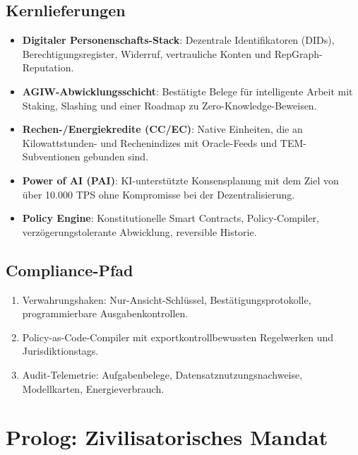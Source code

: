 \documentclass[11pt]{article}
\begin{document}
\subsection{Kernlieferungen}
\begin{itemize}[noitemsep]
  \item \textbf{Digitaler Personenschafts-Stack}: Dezentrale Identifikatoren (DIDs), Berechtigungsregister, Widerruf, vertrauliche Konten und RepGraph-Reputation.
  \item \textbf{AGIW-Abwicklungsschicht}: Bestätigte Belege für intelligente Arbeit mit Staking, Slashing und einer Roadmap zu Zero-Knowledge-Beweisen.
  \item \textbf{Rechen-/Energiekredite (CC/EC)}: Native Einheiten, die an Kilowattstunden- und Rechenindizes mit Oracle-Feeds und TEM-Subventionen gebunden sind.
  \item \textbf{Power of AI (PAI)}: KI-unterstützte Konsensplanung mit dem Ziel von über 10.000 TPS ohne Kompromisse bei der Dezentralisierung.
  \item \textbf{Policy Engine}: Konstitutionelle Smart Contracts, Policy-Compiler, verzögerungstolerante Abwicklung, reversible Historie.
\end{itemize}

\subsection{Compliance-Pfad}
\begin{enumerate}[noitemsep]
  \item Verwahrungshaken: Nur-Ansicht-Schlüssel, Bestätigungsprotokolle, programmierbare Ausgabenkontrollen.
  \item Policy-as-Code-Compiler mit exportkontrollbewussten Regelwerken und Jurisdiktionstags.
  \item Audit-Telemetrie: Aufgabenbelege, Datensatznutzungsnachweise, Modellkarten, Energieverbrauch.
\end{enumerate}

\section{Prolog: Zivilisatorisches Mandat}
\end{document}
